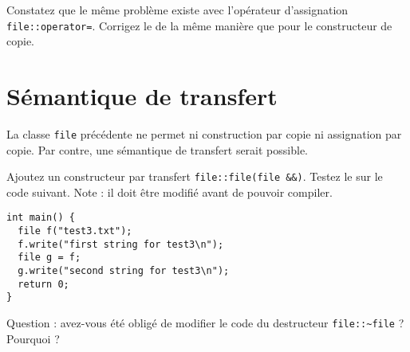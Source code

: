 \documentclass[a4paper]{article}
\begin{document}
Constatez que le même problème existe avec l'opérateur d'assignation
\lstinline|file::operator=|. Corrigez le de la même manière que pour le
constructeur de copie.

\section{Sémantique de transfert}

La classe \lstinline|file| précédente ne permet ni construction par copie
ni assignation par copie. Par contre, une sémantique de transfert serait
possible.

Ajoutez un constructeur par transfert \lstinline|file::file(file &&)|.
Testez le sur le code suivant. Note : il doit être modifié avant de
pouvoir compiler.
\begin{lstlisting}
int main() {
  file f("test3.txt");
  f.write("first string for test3\n");
  file g = f;
  g.write("second string for test3\n");
  return 0;
}
\end{lstlisting}

Question : avez-vous été obligé de modifier le code du destructeur
\lstinline|file::~file| ? Pourquoi ?
\end{document}
